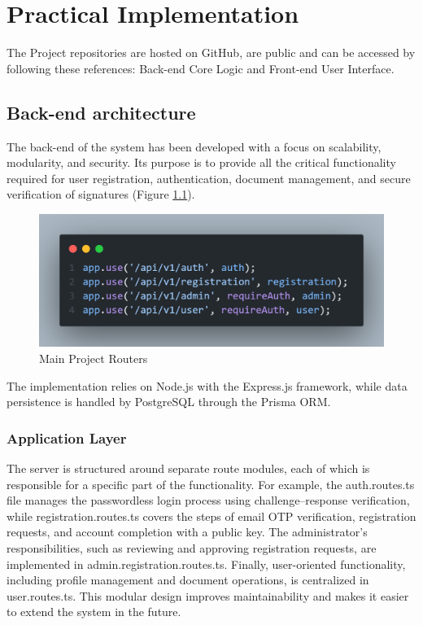 \chapter{Practical Implementation}
The Project repositories are hosted on GitHub, are public and can be accessed by following these references: Back-end Core Logic\cite{alexei_pavlovschii_blocksign_nodate} and Front-end User Interface\cite{vladimir_vitcovschii_blocksign_nodate}.

\section{Back-end architecture}
The back-end of the system has been developed with a focus on scalability, modularity, and security. Its purpose is to provide all the critical functionality required for user registration, authentication, document management, and secure verification of signatures (Figure \ref{main-project-routers}). 

\begin{figure}[H]
    \centering
    \includegraphics[width=18cm]{"images/main-project-routers.png"}
    \caption{Main Project Routers}
    \label{main-project-routers}
\end{figure}

The implementation relies on Node.js with the Express.js framework, while data persistence is handled by PostgreSQL through the Prisma ORM.

\subsection{Application Layer}
The server is structured around separate route modules, each of which is responsible for a specific part of the functionality. For example, the auth.routes.ts file manages the passwordless login process using challenge–response verification, while registration.routes.ts covers the steps of email OTP verification, registration requests, and account completion with a public key. The administrator’s responsibilities, such as reviewing and approving registration requests, are implemented in admin.registration.routes.ts. Finally, user-oriented functionality, including profile management and document operations, is centralized in user.routes.ts. This modular design improves maintainability and makes it easier to extend the system in the future.

